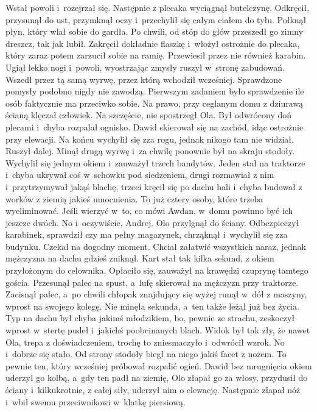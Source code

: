 \documentclass[../MAIN.tex]{subfiles}
\begin{document}
\pp
Wstał powoli i~rozejrzał się. Następnie z plecaka wyciągnął butelczynę. Odkręcił, przysunął do ust, przymknął oczy i~przechylił się całym ciałem do tyłu. Połknął płyn, który wlał sobie do gardła. Po chwili, od stóp do głów przeszedł go zimny dreszcz, tak jak lubił. Zakręcił dokładnie flaszkę i~włożył ostrożnie do plecaka, który zaraz potem zarzucił sobie na ramię. Przewiesił przez nie również karabin. Ugiął lekko nogi i~powoli, wyostrzając zmysły ruszył w~stronę zabudowań. Wszedł przez tą samą wyrwę, przez którą wchodził wcześniej. Sprawdzone pomysły podobno nigdy nie zawodzą.
\pp
Pierwszym zadaniem było sprawdzenie ile osób faktycznie ma przeciwko sobie. Na prawo, przy ceglanym domu z dziurawą ścianą klęczał człowiek. Na szczęście, nie spostrzegł Ola. Był odwrócony doń plecami i~chyba rozpalał ognisko. Dawid skierował się na zachód, idąc ostrożnie przy elewacji. Na końcu wychylił się zza rogu, jednak nikogo tam nie widział. Ruszył dalej. Minął drugą wyrwę i~za chwilę ponownie był na skraju stodoły. Wychylił się jednym okiem i~zauważył trzech bandytów. Jeden stał na traktorze i~chyba ukrywał coś w~schowku pod siedzeniem, drugi rozmawiał z nim i~przytrzymywał jakąś blachę, trzeci kręcił się po dachu hali i~chyba budował z worków z ziemią jakieś umocnienia. To już cztery osoby, które trzeba wyeliminować. Jeśli wierzyć w~to, co mówi Awdan, w~domu powinno być ich jeszcze dwóch. No i~oczywiście, Andrej.
\pp
Olo przylgnął do ściany. Odbezpieczył karabinek, sprawdził czy ma pełny magazynek, chrząknął i~wychylił się zza budynku. Czekał na dogodny moment. Chciał załatwić wszystkich naraz, jednak mężczyzna na dachu gdzieś zniknął. Kart stał tak kilka sekund, z okiem przyłożonym do celownika. Opłaciło się, zauważył na krawędzi czuprynę tamtego gościa. Przesunął palec na spust, a~lufę skierował na mężczyzn przy traktorze. Zacisnął palec, a~po chwili chłopak znajdujący się wyżej runął w~dół z maszyny, wprost na swojego kolegę. Nie minęła sekunda, a~ten także leżał już bez życia. Typ na dachu był chyba jakimś młodzikiem, bo, pewnie ze strachu, zeskoczył wprost w~stertę pudeł i~jakichś poobcinanych blach. Widok był tak zły, że nawet Ola, trepa z doświadczeniem, trochę to zniesmaczyło i~odwrócił wzrok. No i~dobrze się stało. Od strony stodoły biegł na niego jakiś facet z nożem. To pewnie ten, który wcześniej próbował rozpalić ogień. Dawid bez mrugnięcia okiem uderzył go kolbą, a~gdy ten padł na ziemię, Olo złapał go za
włosy, przydusił do ściany i~kilkukrotnie, z całej siły, uderzył nim o elewację. Następnie złapał nóż i~wbił swemu przeciwnikowi w~klatkę piersiową.
\end{document}

